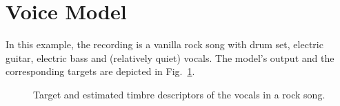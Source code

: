 \section*{Voice Model}
In this example, the recording is a vanilla rock song with drum set, electric guitar, electric bass and (relatively quiet) vocals. The model's output and the corresponding targets are depicted in Fig.~\ref{fig:voice-model}.
\begin{figure}
	\captionsetup{list=no}
	\centering
	\caption{Target and estimated timbre descriptors of the vocals in a rock song.}\label{fig:voice-model}
\end{figure}
